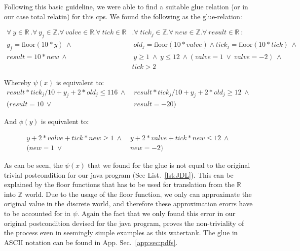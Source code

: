 Following this basic guideline, we were able to find a suitable glue relation (or in our case total relatin) for this cps. We found the following as the glue-relation:

\begin{equation}
	\begin{split}
		\forall~y \in \mathbb{R}~. \forall~y_j \in \mathbb{Z}. \forall~valve \in \mathbb{R}. \forall~tick \in \mathbb{R}&. \forall~tick_j \in \mathbb{Z} . \forall~new \in \mathbb{Z}. \forall~result \in \mathbb{R}~: \\  y_j = \textrm{floor}(10 * y)~\wedge&~ old_j = \textrm{floor}(10*valve) \wedge tick_j = \textrm{floor}(10*tick)~\wedge \\ result = 10 * new~\wedge&~ y \geq 1~\wedge~y \leq 12~\wedge  (valve = 1 ~\vee~valve = -2)~\wedge \\&tick > 2 
	\end{split}
	\label{eq:glueWatertank}
\end{equation}

Whereby \(\psi(x)\) is equivalent to:
\begin{equation}
	\begin{split}
		result * tick_j/10 + y_j + 2 * old_j \leq 116~\wedge&~result * tick_j/10 + y_j + 2 * old_j \geq 12~\wedge \\ (result = 10~\vee&~result = -20)
	\end{split}
	\label{eq:psiWatertank}
\end{equation}

And \(\phi(y)\) is equivalent to:

\begin{equation}
	\begin{split}
		 y + 2 * valve + tick * new \geq 1~\wedge&~y + 2 * valve + tick * new \leq 12~\wedge \\ (new = 1~\vee&~new = -2)
	\end{split}
	\label{eq:phiWatertank}
\end{equation}

As can be seen, the \(\psi(x)\) that we found for the glue is not equal to the original trivial postcondition for our java program (See List.~\ref{lst:JDL}). This can be explained by the floor functions that has to be used for translation from the \(\mathbb{R}\) into \(\mathbb{Z}\) world. Due to the usage of the floor function, we only can approximate the original value in the discrete world, and therefore these approximation erorrs have to be accounted for in \(\psi\). Again the fact that we only found this error in our original postcondition devised for the java program, proves the non-triviality of the process even in seemingly simple examples as this watertank. The glue in ASCII notation can be found in App. Sec.~\ref{app:sec:pdfs}.

